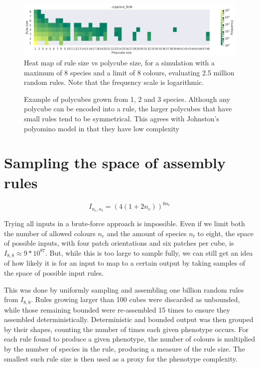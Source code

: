 \begin{figure}
\centering\includegraphics[width=\textwidth]{figures/rs_vs_ps_8c8r.png}
\caption{Heat map of rule size vs polycube size, for a simulation with a maximum of 8 species and a limit of 8 colours, evaluating 2.5 million random rules. Note that the frequency scale is logarithmic.}
\label{fig:rs_vs_ps}\end{figure}

\begin{figure}
\caption{Example of polycubes grown from 1, 2 and 3 species. Although any polycube can be encoded into a rule, the larger polycubes that have small rules tend to be symmetrical. This agrees with Johnston's polyomino model in that they have low complexity}
\label{fig:poly_examples}\end{figure}

\section{Sampling the space of assembly rules}

\[
I_{n_c, n_t} = (4(1+2n_c))^{6n_t}
\]

Trying all inputs in a brute-force approach is impossible. Even if we limit both the number of allowed colours \(n_c\) and the amount of species \(n_t\) to eight, the space of possible inputs, with four patch orientations and six patches per cube, is \(I_{8, 8} \approx 9*10^{87}\).
But, while this is too large to sample fully, we can still get an idea of how likely it is for an input to map to a certain output by taking samples of the space of possible input rules.

This was done by uniformly sampling and assembling one billion random rules from \(I_{8, 8}\). Rules growing larger than 100 cubes were discarded as unbounded, while those remaining bounded were re-assembled 15 times to ensure they assembled deterministically. Deterministic and bounded output was then grouped by their shapes, counting the number of times each given phenotype occurs. For each rule found to produce a given phenotype, the number of colours is multiplied by the number of species in the rule, producing a measure of the rule size. The smallest such rule size is then used as a proxy for the phenotype complexity.

